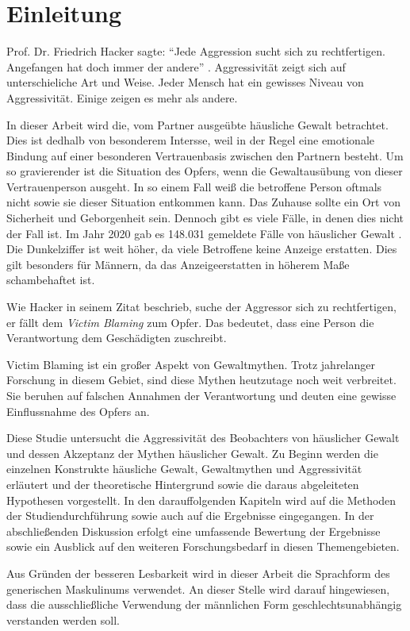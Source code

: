 \chapter{Einleitung}   \label{ch_1}
Prof. Dr. Friedrich Hacker sagte: \enquote{Jede Aggression sucht sich zu rechtfertigen. Angefangen hat doch immer der andere} \parencite{Friedrich_Hacker}. Aggressivität zeigt sich auf unterschieliche Art und Weise. Jeder Mensch hat ein gewisses Niveau von Aggressivität. Einige zeigen es mehr als andere. 


In dieser Arbeit wird die, vom Partner ausgeübte häusliche Gewalt betrachtet. Dies ist dedhalb von besonderem Intersse, weil in der Regel eine emotionale Bindung auf einer besonderen Vertrauenbasis zwischen den Partnern besteht. Um so gravierender ist die Situation des Opfers, wenn die Gewaltausübung von dieser Vertrauenperson ausgeht. In so einem Fall weiß die betroffene Person oftmals nicht sowie sie dieser Situation entkommen kann. Das Zuhause sollte ein Ort von Sicherheit und Geborgenheit sein. Dennoch gibt es viele Fälle, in denen dies nicht der Fall ist. Im Jahr 2020 gab es 148.031 gemeldete Fälle von häuslicher Gewalt \parencite{häusliche_Gewalt}. Die Dunkelziffer ist weit höher, da viele Betroffene keine Anzeige erstatten. Dies gilt besonders für Männern, da das Anzeigeerstatten in höherem Maße schambehaftet ist.

Wie Hacker \parencite{Friedrich_Hacker} in seinem Zitat beschrieb, suche der Aggressor sich zu rechtfertigen, er fällt dem \textit{Victim Blaming} zum Opfer. Das bedeutet, dass eine Person die Verantwortung dem Geschädigten zuschreibt. 

Victim Blaming ist ein großer Aspekt von Gewaltmythen. Trotz jahrelanger Forschung in diesem Gebiet, sind diese Mythen heutzutage noch weit verbreitet. 
Sie beruhen auf falschen Annahmen der Verantwortung und deuten eine gewisse Einflussnahme des Opfers an.

Diese Studie untersucht die Aggressivität des Beobachters von häuslicher Gewalt und dessen Akzeptanz der Mythen häuslicher Gewalt. Zu Beginn werden die einzelnen Konstrukte häusliche Gewalt, Gewaltmythen und Aggressivität erläutert und der theoretische Hintergrund sowie die daraus abgeleiteten Hypothesen vorgestellt. In den darauffolgenden Kapiteln wird auf die Methoden der Studiendurchführung sowie auch auf die Ergebnisse eingegangen. In der 
abschließenden Diskussion erfolgt eine umfassende Bewertung der Ergebnisse sowie ein Ausblick auf den weiteren Forschungsbedarf in diesen Themengebieten.

Aus Gründen der besseren Lesbarkeit wird in dieser Arbeit die Sprachform des generischen Maskulinums verwendet. An dieser Stelle wird darauf hingewiesen, dass die ausschließliche Verwendung der männlichen Form geschlechtsunabhängig verstanden werden soll.